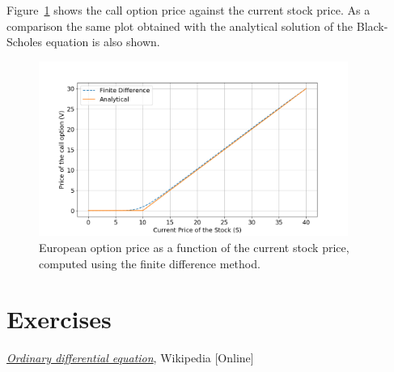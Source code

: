 Figure~\ref{fig:bs_finite_difference} shows the call option price against the current stock price. As a comparison the same plot obtained with the analytical solution of the Black-Scholes equation is also shown. 

\begin{figure}[htb]
	\centering
	\includegraphics[width=0.9\textwidth]{figures/bs_finite_difference}
	\caption{European option price as a function of the current stock price, computed using the finite difference method.}
	\label{fig:bs_finite_difference}
\end{figure} 

\section{Exercises}


\begin{thebibliography}{9}
\href{https://en.wikipedia.org/wiki/Ordinary_differential_equation}{\emph{Ordinary differential equation}}, Wikipedia [Online]
\end{thebibliography}